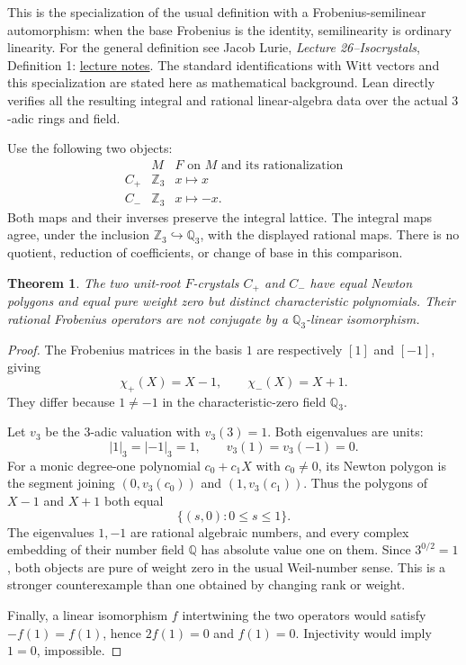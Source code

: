 \documentclass[11pt]{article}
\newtheorem{theorem}{Theorem}
\begin{document}
This is the specialization of the usual definition with a
Frobenius-semilinear automorphism: when the base Frobenius is the
identity, semilinearity is ordinary linearity. For the general
definition see Jacob Lurie, \emph{Lecture 26--Isocrystals},
Definition 1:
\href{https://www.math.ias.edu/~lurie/205notes/Lecture26-Isocrystals.pdf}{lecture notes}.
The standard identifications with Witt vectors and this
specialization are stated here as mathematical background.
Lean directly verifies all the resulting integral and rational
linear-algebra data over the actual $3$-adic rings and field.

Use the following two objects:
\[
 \begin{array}{c|c|c}
 &M&F\text{ on }M\text{ and its rationalization}\\\hline
 C_+&\mathbb Z_3&x\longmapsto x\\
 C_-&\mathbb Z_3&x\longmapsto -x.
 \end{array}
\]
Both maps and their inverses preserve the integral lattice. The
integral maps agree, under the inclusion
$\mathbb Z_3\hookrightarrow\mathbb Q_3$, with the displayed
rational maps. There is no quotient, reduction of coefficients, or
change of base in this comparison.

\begin{theorem}
The two unit-root $F$-crystals $C_+$ and $C_-$ have equal Newton
polygons and equal pure weight zero but distinct characteristic
polynomials. Their rational Frobenius operators are not conjugate
by a $\mathbb Q_3$-linear isomorphism.
\end{theorem}
\begin{proof}
The Frobenius matrices in the basis $1$ are respectively $[1]$
and $[-1]$, giving
\[
 \chi_+(X)=X-1,\qquad \chi_-(X)=X+1.
\]
They differ because $1\ne-1$ in the characteristic-zero field
$\mathbb Q_3$.

Let $v_3$ be the $3$-adic valuation with $v_3(3)=1$.
Both eigenvalues are units:
\[
 |1|_3=|-1|_3=1,\qquad v_3(1)=v_3(-1)=0.
\]
For a monic degree-one polynomial $c_0+c_1X$ with $c_0\ne0$,
its Newton polygon is the segment joining
$(0,v_3(c_0))$ and $(1,v_3(c_1))$. Thus the polygons of
$X-1$ and $X+1$ both equal
\[
 \{(s,0):0\le s\le1\}.
\]
The eigenvalues $1,-1$ are rational algebraic numbers, and every
complex embedding of their number field $\mathbb Q$ has absolute
value one on them. Since $3^{0/2}=1$, both objects are pure of
weight zero in the usual Weil-number sense. This is a stronger
counterexample than one obtained by changing rank or weight.

Finally, a linear isomorphism $f$ intertwining the two operators
would satisfy $-f(1)=f(1)$, hence $2f(1)=0$ and $f(1)=0$.
Injectivity would imply $1=0$, impossible.
\end{proof}
\end{document}
